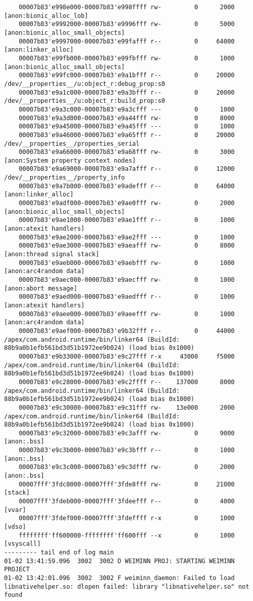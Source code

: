 \begin{lstlisting}
    00007b83'e998e000-00007b83'e998ffff rw-         0      2000  [anon:bionic_alloc_lob]
    00007b83'e9992000-00007b83'e9996fff rw-         0      5000  [anon:bionic_alloc_small_objects]
    00007b83'e9997000-00007b83'e99fafff r--         0     64000  [anon:linker_alloc]
    00007b83'e99fb000-00007b83'e99fbfff rw-         0      1000  [anon:bionic_alloc_small_objects]
    00007b83'e99fc000-00007b83'e9a1bfff r--         0     20000  /dev/__properties__/u:object_r:debug_prop:s0
    00007b83'e9a1c000-00007b83'e9a3bfff r--         0     20000  /dev/__properties__/u:object_r:build_prop:s0
    00007b83'e9a3c000-00007b83'e9a3cfff ---         0      1000
    00007b83'e9a3d000-00007b83'e9a44fff rw-         0      8000
    00007b83'e9a45000-00007b83'e9a45fff ---         0      1000
    00007b83'e9a46000-00007b83'e9a65fff r--         0     20000  /dev/__properties__/properties_serial
    00007b83'e9a66000-00007b83'e9a68fff rw-         0      3000  [anon:System property context nodes]
    00007b83'e9a69000-00007b83'e9a7afff r--         0     12000  /dev/__properties__/property_info
    00007b83'e9a7b000-00007b83'e9adefff r--         0     64000  [anon:linker_alloc]
    00007b83'e9adf000-00007b83'e9ae0fff rw-         0      2000  [anon:bionic_alloc_small_objects]
    00007b83'e9ae1000-00007b83'e9ae1fff r--         0      1000  [anon:atexit handlers]
    00007b83'e9ae2000-00007b83'e9ae2fff ---         0      1000
    00007b83'e9ae3000-00007b83'e9aeafff rw-         0      8000  [anon:thread signal stack]
    00007b83'e9aeb000-00007b83'e9aebfff rw-         0      1000  [anon:arc4random data]
    00007b83'e9aec000-00007b83'e9aecfff rw-         0      1000  [anon:abort message]
    00007b83'e9aed000-00007b83'e9aedfff r--         0      1000  [anon:atexit handlers]
    00007b83'e9aee000-00007b83'e9aeefff rw-         0      1000  [anon:arc4random data]
    00007b83'e9aef000-00007b83'e9b32fff r--         0     44000  /apex/com.android.runtime/bin/linker64 (BuildId: 88b9a0b1efb561bd3d51b1972ee9b024) (load bias 0x1000)
    00007b83'e9b33000-00007b83'e9c27fff r-x     43000     f5000  /apex/com.android.runtime/bin/linker64 (BuildId: 88b9a0b1efb561bd3d51b1972ee9b024) (load bias 0x1000)
    00007b83'e9c28000-00007b83'e9c2ffff r--    137000      8000  /apex/com.android.runtime/bin/linker64 (BuildId: 88b9a0b1efb561bd3d51b1972ee9b024) (load bias 0x1000)
    00007b83'e9c30000-00007b83'e9c31fff rw-    13e000      2000  /apex/com.android.runtime/bin/linker64 (BuildId: 88b9a0b1efb561bd3d51b1972ee9b024) (load bias 0x1000)
    00007b83'e9c32000-00007b83'e9c3afff rw-         0      9000  [anon:.bss]
    00007b83'e9c3b000-00007b83'e9c3bfff r--         0      1000  [anon:.bss]
    00007b83'e9c3c000-00007b83'e9c3dfff rw-         0      2000  [anon:.bss]
    00007fff'3fdc8000-00007fff'3fde8fff rw-         0     21000  [stack]
    00007fff'3fdeb000-00007fff'3fdeefff r--         0      4000  [vvar]
    00007fff'3fdef000-00007fff'3fdeffff r-x         0      1000  [vdso]
    ffffffff'ff600000-ffffffff'ff600fff --x         0      1000  [vsyscall]
--------- tail end of log main
01-02 13:41:59.096  3002  3002 D WEIMINN PROJ: STARTING WEIMINN PROJECT
01-02 13:42:01.096  3002  3002 F weiminn_daemon: Failed to load libnativehelper.so: dlopen failed: library "libnativehelper.so" not found


\end{lstlisting}
